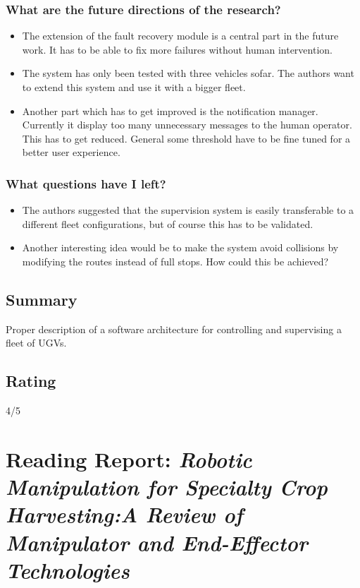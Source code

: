 \subsubsection*{What are the future directions of the research?}
\begin{itemize}
    \item The extension of the fault recovery module is a central part in the future work. It has to be able to fix more failures without human intervention. 
    \item The system has only been tested with three vehicles sofar. The authors want to extend this system and use it with a bigger fleet.
    \item Another part which has to get improved is the notification manager. Currently it display too many unnecessary messages to the human operator. This has to get reduced. General some threshold have to be fine tuned for a better user experience.
\end{itemize}
\subsubsection*{What questions have I left?}
\begin{itemize}
    \item The authors suggested that the supervision system is easily transferable to a different fleet configurations, but of course this has to be validated. 
    \item Another interesting idea would be to make the system avoid collisions by modifying the routes instead of full stops. How could this be achieved?
\end{itemize}

\subsection*{Summary}
Proper description of a software architecture for controlling and supervising a fleet of UGVs.
\subsection*{Rating}
4/5



\section{Reading Report: \emph{Robotic Manipulation for Specialty Crop Harvesting:A Review of Manipulator and End-Effector Technologies}}
\cite{Davidson2020}

